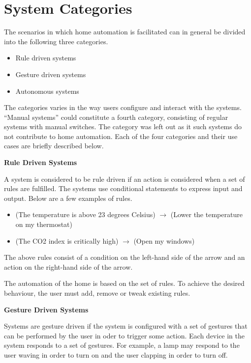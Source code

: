 \section{System Categories}\label{sec:system-categories}

The scenarios in which home automation is facilitated can in general be divided into the following three categories.

\begin{itemize}
\item Rule driven systems
\item Gesture driven systems
\item Autonomous systems
\end{itemize}

The categories varies in the way users configure and interact with the systems. ``Manual systems'' could constitute a fourth category, consisting of regular systems with manual switches. The category was left out as it such systems do not contribute to home automation.
Each of the four categories and their use cases are briefly described below.

\textbf{Rule Driven Systems}

A system is considered to be rule driven if an action is considered when a set of rules are  fulfilled. The systems use conditional statements to express input and output. Below are a few examples of rules.

\begin{itemize}
\item (The temperature is above 23 degrees Celsius) $\rightarrow$ (Lower the temperature on my thermostat)
\item (The CO2 index is critically high) $\rightarrow$ (Open my windows)
\end{itemize}

The above rules consist of a condition on the left-hand side of the arrow and an action on the right-hand side of the arrow.

The automation of the home is based on the set of rules. To achieve the desired behaviour, the user must add, remove or tweak existing rules.

\textbf{Gesture Driven Systems}

Systems are gesture driven if the system is configured with a set of gestures that can be performed by the user in oder to trigger some action. Each device in the system responds to a set of gestures. For example, a lamp may respond to the user waving in order to turn on and the user clapping in order to turn off.

